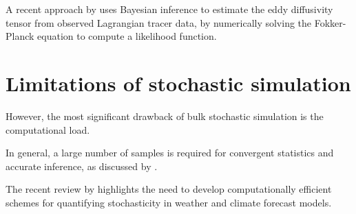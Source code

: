 A recent approach by \cite{YingEtAl_2019_BayesianInferenceOcean} uses Bayesian inference to estimate the eddy diffusivity tensor from observed Lagrangian tracer data, by numerically solving the Fokker-Planck equation to compute a likelihood function.


\section{Limitations of stochastic simulation}


However, the most significant drawback of bulk stochastic simulation is the computational load.


In general, a large number of samples is required for convergent statistics and accurate inference, as discussed by \citet{Leutbecher_2019_EnsembleSizeHow}.


The recent review by \citet{LeutbecherEtAl_2017_StochasticRepresentationsModel} highlights the need to develop computationally efficient schemes for quantifying stochasticity in weather and climate forecast models.
